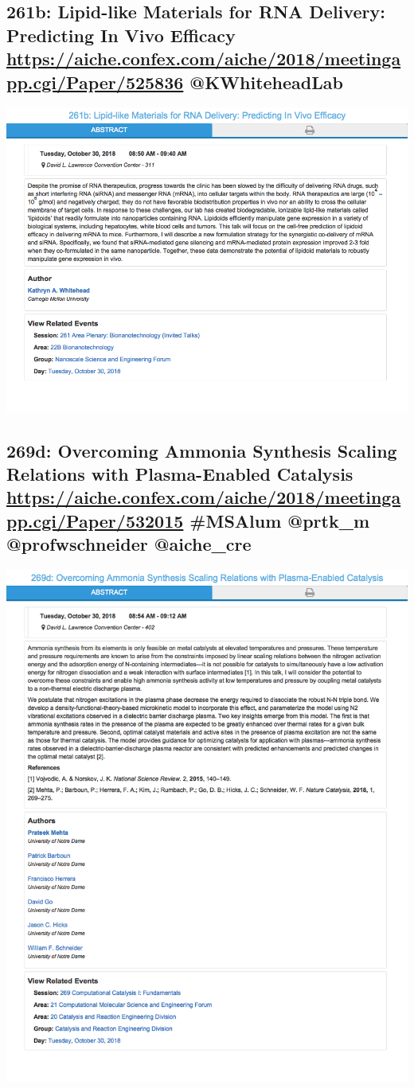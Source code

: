 \documentclass[11pt]{article}
\begin{document}
\subsection{261b: Lipid-like Materials for RNA Delivery: Predicting In Vivo Efficacy \url{https://aiche.confex.com/aiche/2018/meetingapp.cgi/Paper/525836} @KWhiteheadLab}
\label{sec:orge8465e1}
\begin{center}
\includegraphics[width=.9\linewidth]{./525836.png}
\end{center}
\subsection{269d: Overcoming Ammonia Synthesis Scaling Relations with Plasma-Enabled Catalysis \url{https://aiche.confex.com/aiche/2018/meetingapp.cgi/Paper/532015} \#MSAlum @prtk\_m @profwschneider @aiche\_cre}
\label{sec:org7e19bc5}
\begin{center}
\includegraphics[width=.9\linewidth]{./532015.png}
\end{center}
\end{document}
